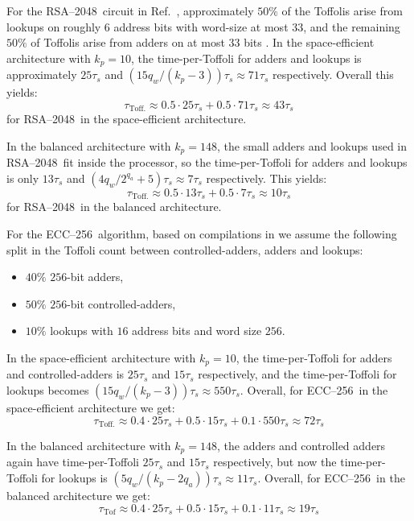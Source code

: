 \documentclass[reprint,twocolumn,secnumarabic,amssymb, aps, prx]{revtex4-2}
\newcommand{\ttoff}{\tau_\text{Toff.}}
\newcommand{\ecc}{\mbox{ECC--256}}
\newcommand{\rsa}{\mbox{RSA--2048}}
\newcommand{\kproc}{k_p}
\newcommand{\taus}{\tau_s}
\begin{document}
For the \rsa\ circuit in Ref.~\cite{gidney2025how}, approximately $50\%$ of the Toffolis arise from lookups on roughly 6 address bits with word-size at most $33$, and the remaining $50\%$ of Toffolis arise from adders on at most $33$ bits \cite{gidney2025how}. In the space-efficient architecture with $\kproc=10$, the time-per-Toffoli for adders and lookups is approximately $25\taus$ and $(15q_w/(\kproc - 3)) \taus \approx 71 \taus$ respectively. Overall this yields:
\begin{equation}
    \ttoff \approx 0.5 \cdot 25 \taus + 0.5 \cdot 71 \taus \approx 43 \taus
\end{equation}
for \rsa\ in the space-efficient architecture.

In the balanced architecture with $\kproc=148$, the small adders and lookups used in \rsa\ fit inside the processor, so the time-per-Toffoli for adders and lookups is only $13\taus$ and $(4 q_w / 2^{q_a} + 5) \taus \approx 7 \taus$ respectively. This yields:
\begin{equation}
    \ttoff \approx 0.5 \cdot 13 \taus + 0.5 \cdot 7 \taus \approx 10 \taus
\end{equation}
for \rsa\ in the balanced architecture.

For the \ecc\ algorithm, based on compilations in \cite{proos2003shor, roetteler2017quantum, haner2020improved, litinski2023compute, gouzien2023performance} we assume the following split in the Toffoli count between controlled-adders, adders and lookups:
\begin{itemize}
    \item $40\%$ $256$-bit adders,
    \item $50\%$ $256$-bit controlled-adders,
    \item $10\%$ lookups with $16$ address bits and word size $256$.
\end{itemize}
In the space-efficient architecture with $\kproc=10$, the time-per-Toffoli for adders and controlled-adders is $25\taus$ and $15\taus$ respectively, and the time-per-Toffoli for lookups becomes $(15q_w/(\kproc - 3)) \taus \approx 550 \taus$. Overall, for \ecc\ in the space-efficient architecture we get:
\begin{equation}
    \ttoff \approx 0.4 \cdot 25 \taus + 0.5 \cdot 15 \taus + 0.1 \cdot 550 \taus \approx 72 \taus
\end{equation}

In the balanced architecture with $\kproc=148$, the adders and controlled adders again have time-per-Toffoli $25\taus$ and $15\taus$ respectively, but now the time-per-Toffoli for lookups is $(5q_w/(\kproc - 2q_a)) \taus \approx 11 \taus$. Overall, for \ecc\ in the balanced architecture we get:
\begin{equation}
    \tau_{\mathrm{Tof}} \approx 0.4 \cdot 25 \taus + 0.5 \cdot 15 \taus + 0.1 \cdot 11 \taus \approx  19 \taus
\end{equation}
\end{document}
